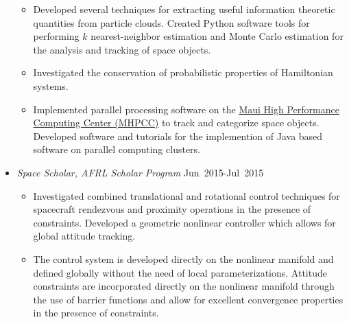 \begin{itemize}
        \begin{itemize}
            \item Developed several techniques for extracting useful information theoretic quantities from particle clouds. 
            Created Python software tools for performing \(k\) nearest-neighbor estimation and Monte Carlo estimation for the analysis and tracking of space objects.
            \item Investigated the conservation of probabilistic properties of Hamiltonian systems.
            \item Implemented parallel processing software on the \href{https://www.mhpcc.hpc.mil/}{Maui High Performance Computing Center (MHPCC)} to track and categorize space objects.
            Developed software and tutorials for the implemention of Java based software on parallel computing clusters.
        \end{itemize}
        \item[] \textit{Space Scholar, AFRL Scholar Program} \hfill {Jun~2015-Jul~2015}
        \begin{itemize}
            \item Investigated combined translational and rotational control techniques for spacecraft rendezvous and proximity operations in the presence of constraints.
            Developed a geometric nonlinear controller which allows for global attitude tracking.
            \item The control system is developed directly on the nonlinear manifold and defined globally without the need of local parameterizations.
            Attitude constraints are incorporated directly on the nonlinear manifold through the use of barrier functions and allow for excellent convergence properties in the presence of constraints. 
        \end{itemize}
    \end{itemize}
    